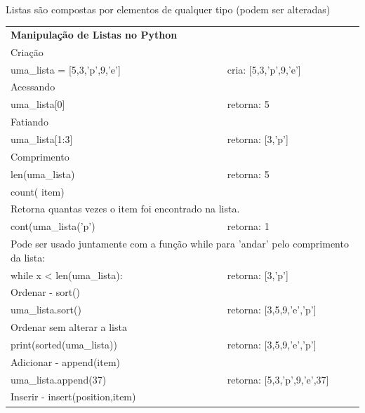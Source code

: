 \documentclass[landscape,a0paper,fontscale=0.285]{baposter} %
\begin{document}
\begin{poster}
{						\colorbox[HTML]{CCFFFF}{}
						\linebreak \\
						Listas são compostas por elementos de qualquer tipo (podem ser alteradas) \linebreak \\
						\begin{tabular}{@{}ll@{}}
							\textbf{Manipulação de Listas no Python}\\
							\multicolumn{2}{l}{\cellcolor[HTML]{DDFFFF}Criação} \\
							uma\_lista = [5,3,'p',9,'e'] & cria: [5,3,'p',9,'e'] \\
							\multicolumn{2}{l}{\cellcolor[HTML]{DDFFFF}Acessando} \\
							uma\_lista[0] & retorna: 5 \\
							\multicolumn{2}{l}{\cellcolor[HTML]{DDFFFF}Fatiando} \\
							uma\_lista[1:3] & retorna: [3,'p'] \\
							\multicolumn{2}{l}{\cellcolor[HTML]{DDFFFF}Comprimento} \\
							len(uma\_lista) & retorna: 5 \\
							\multicolumn{2}{l}{\cellcolor[HTML]{DDFFFF}count( item)} \\
							\multicolumn{2}{l}{Retorna quantas vezes o item foi encontrado na lista.} \\
							cont(uma\_lista('p') & retorna: 1 \\
							\multicolumn{2}{l}{Pode ser usado juntamente com a função while para 'andar' pelo comprimento da lista:} \\
							while x < len(uma\_lista): & retorna: [3,'p']\\
							\multicolumn{2}{l}{\cellcolor[HTML]{DDFFFF}Ordenar - sort()} \\
							uma\_lista.sort() & retorna: [3,5,9,'e','p'] \\
							\multicolumn{2}{l}{Ordenar sem alterar a lista} \\
							print(sorted(uma\_lista)) & retorna: [3,5,9,'e','p'] \\
							\multicolumn{2}{l}{\cellcolor[HTML]{DDFFFF}Adicionar - append(item)} \\
							uma\_lista.append(37) & retorna: [5,3,'p',9,'e',37] \\
							\multicolumn{2}{l}{\cellcolor[HTML]{DDFFFF}Inserir - insert(position,item)} \\

\end{tabular}}
\end{poster}
\end{document}
